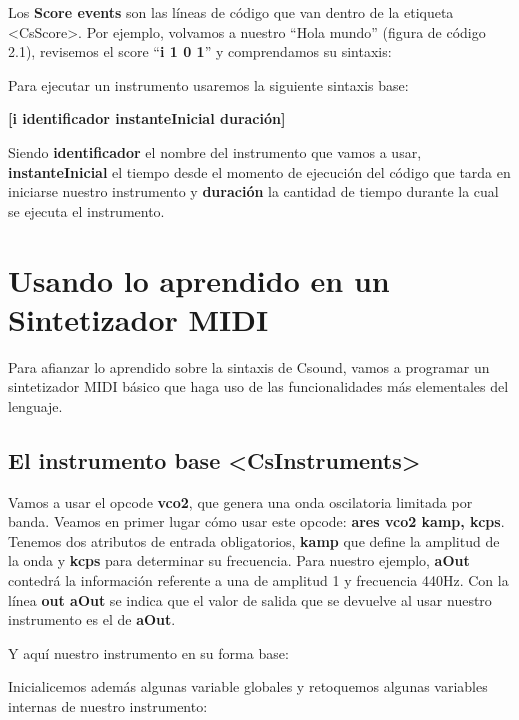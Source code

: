 Los \textbf{Score events} son las líneas de código que van dentro de la etiqueta \textless CsScore\textgreater. Por ejemplo, volvamos a nuestro ``Hola mundo'' (figura de código 2.1), revisemos el score ``\textbf{i 1 0 1}'' y comprendamos su sintaxis: 

Para ejecutar un instrumento usaremos la siguiente sintaxis base: \bigskip

\textbf{[i identificador instanteInicial duración]}\bigskip

 Siendo \textbf{identificador} el nombre del instrumento que vamos a usar, \textbf{instanteInicial} el tiempo desde el momento de ejecución del código que tarda en iniciarse nuestro instrumento y \textbf{duración} la cantidad de tiempo durante la cual se ejecuta el instrumento.



\section{Usando lo aprendido en un Sintetizador MIDI}\label{sec:usandoAprendido}

Para afianzar lo aprendido sobre la sintaxis de Csound, vamos a programar un sintetizador MIDI básico que haga uso de las funcionalidades más elementales del lenguaje.

\subsection{El instrumento base \textless CsInstruments\textgreater}\label{sec:instSinte}

Vamos a usar el opcode \textbf{vco2}, que genera una onda oscilatoria limitada por banda. Veamos en primer lugar cómo usar este opcode: \textbf{ares vco2 kamp, kcps}. Tenemos dos atributos de entrada obligatorios, \textbf{kamp} que define la amplitud de la onda y \textbf{kcps} para determinar su frecuencia.
Para nuestro ejemplo, \textbf{aOut} contedrá la información referente a una de amplitud 1 y frecuencia 440Hz. Con la línea \textbf{out aOut} se indica que el valor de salida que se devuelve al usar nuestro instrumento es el de \textbf{aOut}.

Y aquí nuestro instrumento en su forma base:

Inicialicemos además algunas variable globales y retoquemos algunas variables internas de nuestro instrumento:


